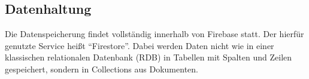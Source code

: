 \subsection{Datenhaltung}
Die Datenspeicherung findet vollständig innerhalb von Firebase statt.
Der hierfür genutzte Service heißt \enquote{Firestore}.
Dabei werden Daten nicht wie in einer klassischen relationalen Datenbank (\ac{RDB}) in Tabellen mit Spalten und Zeilen gespeichert, sondern in Collections aus Dokumenten.






